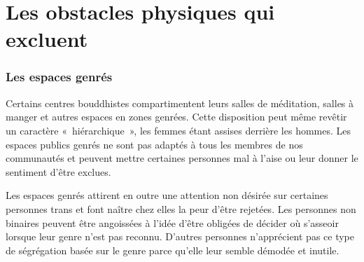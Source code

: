 \documentclass[12pt,openany]{book}
\begin{document}
\begin{figure}[h]
    \centering
\end{figure}

\section*{Les obstacles physiques qui excluent}

\subsubsection*{Les espaces genrés}

\noindent Certains centres bouddhistes compartimentent leurs salles de méditation, salles à manger et autres espaces en zones genrées. Cette disposition peut même revêtir un caractère \mbox{« hiérarchique »}, les femmes étant assises derrière les hommes. Les espaces publics genrés ne sont pas adaptés à tous les membres de nos communautés et peuvent mettre certaines personnes mal à l’aise ou leur donner le sentiment d’être exclues.

Les espaces genrés attirent en outre une attention non désirée sur certaines personnes trans et font naître chez elles la peur d’être rejetées. Les personnes non binaires peuvent être angoissées à l’idée d’être obligées de décider où s’asseoir lorsque leur genre n’est pas reconnu. D’autres personnes n’apprécient pas ce type de ségrégation basée sur le genre parce qu’elle leur semble démodée et inutile.
\end{document}
